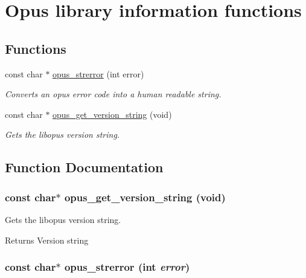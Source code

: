 \hypertarget{group__opus__libinfo}{
\section{Opus library information functions}
\label{group__opus__libinfo}
}
\subsection*{Functions}
\begin{DoxyCompactItemize}
\item 
const char $\ast$ \hyperlink{group__opus__libinfo_gafad3bac5a05dc7c3477a5765eb5e1873}{opus\_\-strerror} (int error)
\begin{DoxyCompactList}\small\item\em Converts an opus error code into a human readable string. \item\end{DoxyCompactList}\item 
const char $\ast$ \hyperlink{group__opus__libinfo_ga3cd7aa16259a46f37a44d2e823b131e5}{opus\_\-get\_\-version\_\-string} (void)
\begin{DoxyCompactList}\small\item\em Gets the libopus version string. \item\end{DoxyCompactList}\end{DoxyCompactItemize}


\subsection{Function Documentation}
\hypertarget{group__opus__libinfo_ga3cd7aa16259a46f37a44d2e823b131e5}{
\subsubsection[{opus\_\-get\_\-version\_\-string}]{\setlength{\rightskip}{0pt plus 5cm}const char$\ast$ opus\_\-get\_\-version\_\-string (void)}}
\label{group__opus__libinfo_ga3cd7aa16259a46f37a44d2e823b131e5}


Gets the libopus version string. \begin{DoxyReturn}{Returns}
Version string 
\end{DoxyReturn}
\hypertarget{group__opus__libinfo_gafad3bac5a05dc7c3477a5765eb5e1873}{
\subsubsection[{opus\_\-strerror}]{\setlength{\rightskip}{0pt plus 5cm}const char$\ast$ opus\_\-strerror (int {\em error})}}
\label{group__opus__libinfo_gafad3bac5a05dc7c3477a5765eb5e1873}


